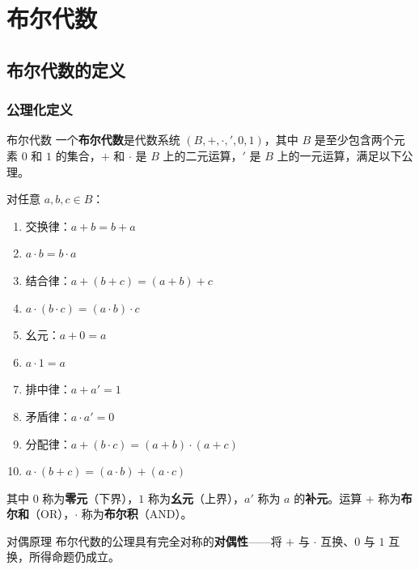 \chapter{布尔代数}

\section{布尔代数的定义}

\subsection{公理化定义}

\begin{mydefinition}{布尔代数}
一个\textbf{布尔代数}是代数系统 \((B,+,\cdot,{}',0,1)\)，其中 \(B\) 是至少包含两个元素 \(0\) 和 \(1\) 的集合，\(+\) 和 \(\cdot\) 是 \(B\) 上的二元运算，\({}'\) 是 \(B\) 上的一元运算，满足以下公理。
\end{mydefinition}

对任意 \(a,b,c\in B\)：

\begin{enumerate}[label=\textbf{B\arabic*}:,leftmargin=*]
    \item 交换律：\(a+b=b+a\)
    \item[$\text{B}1'$] \(a\cdot b = b\cdot a\)
    \item 结合律：\(a+(b+c)=(a+b)+c\)
    \item[$\text{B}2'$] \(a\cdot(b\cdot c)=(a\cdot b)\cdot c\)
    \item 幺元：\(a+0=a\)
    \item[$\text{B}3'$] \(a\cdot 1 = a\)
    \item 排中律：\(a+a'=1\)
    \item[$\text{B}4'$] 矛盾律：\(a\cdot a'=0\)
    \item 分配律：\(a+(b\cdot c)=(a+b)\cdot(a+c)\)
    \item[$\text{B}5'$] \(a\cdot(b+c)=(a\cdot b)+(a\cdot c)\)
\end{enumerate}

其中 \(0\) 称为\textbf{零元}（下界），\(1\) 称为\textbf{幺元}（上界），\(a'\) 称为 \(a\) 的\textbf{补元}。运算 \(+\) 称为\textbf{布尔和}（OR），\(\cdot\) 称为\textbf{布尔积}（AND）。

\begin{myTheorem}{对偶原理}
布尔代数的公理具有完全对称的\textbf{对偶性}——将 \(+\) 与 \(\cdot\) 互换、\(0\) 与 \(1\) 互换，所得命题仍成立。
\end{myTheorem}

